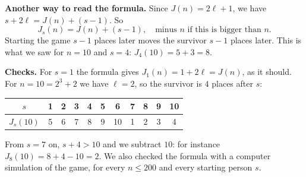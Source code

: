 \textbf{Another way to read the formula.} Since $J(n)=2\ell+1$, we have
$s+2\ell=J(n)+(s-1)$. So
\[
J_s(n)=J(n)+(s-1),\quad\text{minus $n$ if this is bigger than $n$.}
\]
Starting the game $s-1$ places later moves the survivor $s-1$ places later.
This is what we saw for $n=10$ and $s=4$: $J_4(10)=5+3=8$.

\textbf{Checks.} For $s=1$ the formula gives $J_1(n)=1+2\ell=J(n)$, as it should. For
$n=10=2^3+2$ we have $\ell=2$, so the survivor is $4$ places after $s$:
\begin{center}
\renewcommand{\arraystretch}{1.2}
\begin{tabular}{|c|c|c|c|c|c|c|c|c|c|c|}
\hline
$s$ & 1&2&3&4&5&6&7&8&9&10\\ \hline
$J_s(10)$ & 5&6&7&8&9&10&1&2&3&4\\ \hline
\end{tabular}
\end{center}
From $s=7$ on, $s+4>10$ and we subtract $10$: for instance $J_8(10)=8+4-10=2$.
We also checked the formula with a computer simulation of the game, for every
$n\leq200$ and every starting person $s$.
